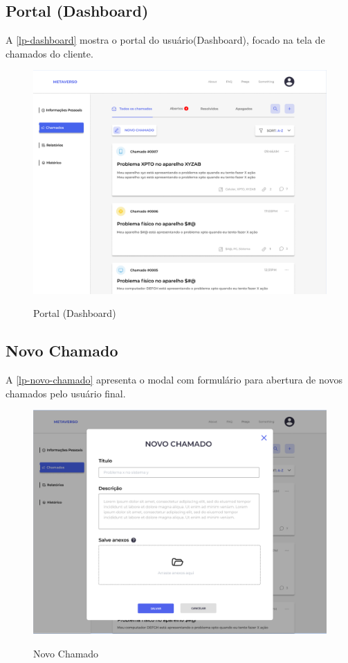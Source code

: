     
\subsection{Portal (Dashboard)} 
    A \autoref{lp-dashboard} mostra o portal do usuário(Dashboard), focado na tela de chamados do cliente.
    \begin{figure}[h]
        \caption{Portal (Dashboard)}
        \centering %
        \label{lp-dashboard}
        \includegraphics[width=15cm]{LaTeX/metaversoIFSP/anexos/dashboard-chamados.png} %
    \end{figure}
    
\subsection{Novo Chamado} 
        A \autoref{lp-novo-chamado} apresenta o modal com formulário para abertura de novos chamados pelo usuário final.
    \begin{figure}[h]
        \caption{Novo Chamado}
        \centering %
        \label{lp-novo-chamado}
        \includegraphics[width=15cm]{LaTeX/metaversoIFSP/anexos/novo-chamado.png} %
    \end{figure}